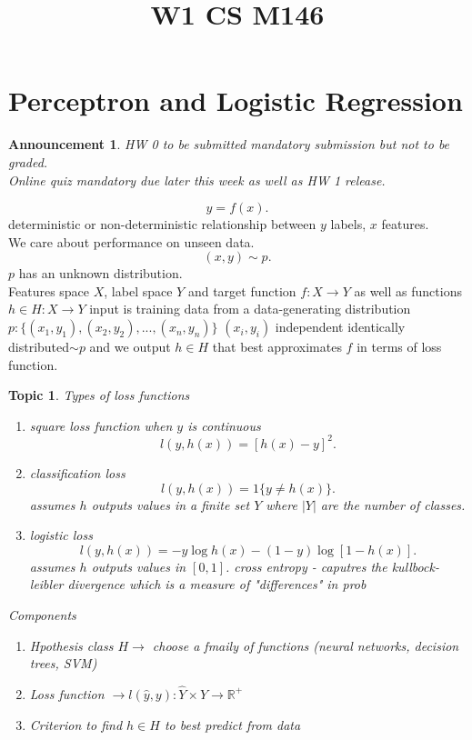 \documentclass[a4paper,12pt]{scrartcl} %
\theoremstyle{darktheorem}
\newtheorem{topic}[theorem]{Topic}
\newtheorem{announcement}[theorem]{Announcement}
\begin{document}
\title{\color{sectioncolor}W1 CS M146}
\author{}
\date{}
\maketitle

\thispagestyle{fancy}
\section{Perceptron and Logistic Regression}
\begin{announcement}
    HW 0 to be submitted mandatory submission but not to be graded.\\
    Online quiz mandatory due later this week as well as HW 1 release.
\end{announcement}
\[
y = f(x)
.\] 
deterministic or non-deterministic relationship between $y$ labels, $x$ features.\\
We care about performance on unseen data.
\[
    (x,y) \sim p
.\] 
$p$ has an unknown distribution.\\
Features space $X$, label space $Y$ and target function $f: X \rightarrow Y$ as well as functions $h \in H: X \rightarrow Y$
input is training data from a data-generating distribution $p: \{(x_1,y_1), (x_2,y_2),...,(x_n,y_n)\}$ $(x_i,y_i) $ independent identically distributed$ \sim p$
and we output $h \in H$ that best approximates $f$ in terms of loss function.
\begin{topic}
    Types of loss functions\\
    \begin{enumerate}
        \item square loss function when $y$ is continuous
            \[
                l(y,h(x)) = [h(x)-y]^2
            .\] 
        \item classification loss
            \[
                l(y,h(x)) = 1\{y \ne h(x)\}
            .\] 
            assumes $h$ outputs values in a finite set $Y$ where $|Y|$ are the number of classes.
        \item logistic loss
            \[
                l(y,h(x)) = -y \log h(x) - (1-y) \log [1-h(x)]
            .\] 
            assumes $h$ outputs values in $[0,1]$. 
            cross entropy - caputres the kullbock-leibler divergence which is a measure
            of "differences" in prob
    \end{enumerate}
    Components
    \begin{enumerate}
        \item Hpothesis class $H \rightarrow$ choose a fmaily of functions (neural networks, decision trees, SVM)
        \item Loss function $\rightarrow l(\hat y, y) : \hat Y \times Y \rightarrow \mathbb{R}^{+}$
        \item Criterion to find $h \in H$ to best predict from data
    \end{enumerate}
\end{topic}
\end{document}
